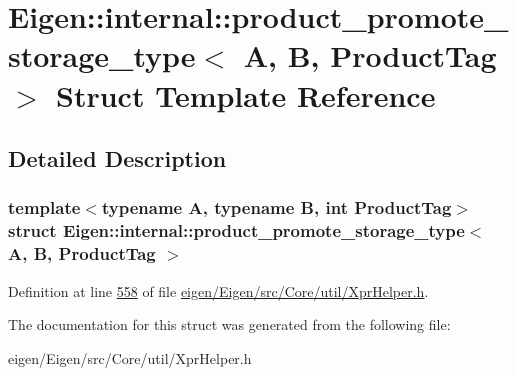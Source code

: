 \hypertarget{struct_eigen_1_1internal_1_1product__promote__storage__type}{}\section{Eigen\+:\+:internal\+:\+:product\+\_\+promote\+\_\+storage\+\_\+type$<$ A, B, Product\+Tag $>$ Struct Template Reference}
\label{struct_eigen_1_1internal_1_1product__promote__storage__type}


\subsection{Detailed Description}
\subsubsection*{template$<$typename A, typename B, int Product\+Tag$>$\newline
struct Eigen\+::internal\+::product\+\_\+promote\+\_\+storage\+\_\+type$<$ A, B, Product\+Tag $>$}



Definition at line \hyperlink{eigen_2_eigen_2src_2_core_2util_2_xpr_helper_8h_source_l00558}{558} of file \hyperlink{eigen_2_eigen_2src_2_core_2util_2_xpr_helper_8h_source}{eigen/\+Eigen/src/\+Core/util/\+Xpr\+Helper.\+h}.



The documentation for this struct was generated from the following file\+:\begin{DoxyCompactItemize}
\item 
eigen/\+Eigen/src/\+Core/util/\+Xpr\+Helper.\+h\end{DoxyCompactItemize}
